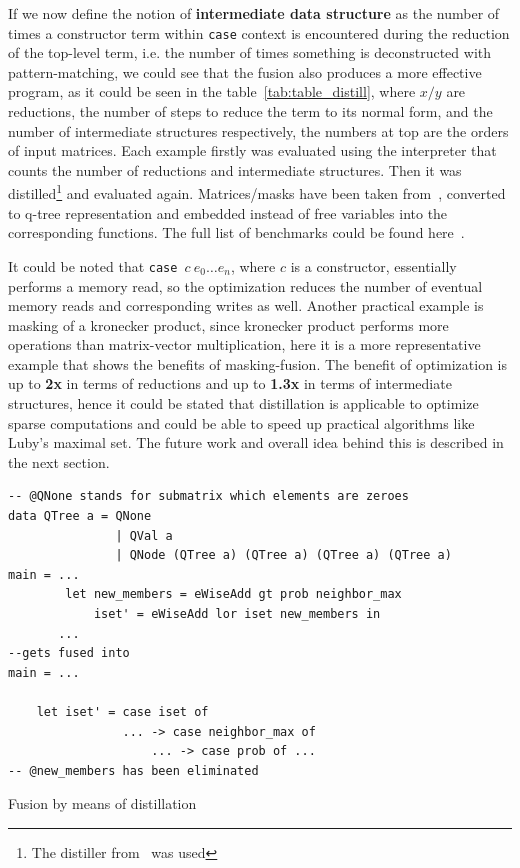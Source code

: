 \documentclass[acmsmall,review,nonacm]{acmart}\settopmatter{printfolios=true,printccs=false,printacmref=false}
\begin{document}
If we now define the notion of \textbf{intermediate data structure} as the number of times a constructor term within \texttt{case} context is encountered during the reduction of the top-level term, i.e. the number of times something is deconstructed with pattern-matching, we could see that the fusion also produces a more effective program, as it could be seen in the table~\ref{tab:table_distill}, where $x / y$ are reductions, the number of steps to reduce the term to its normal form, and the number of intermediate structures respectively, the numbers at top are the orders of input matrices. Each example firstly was evaluated using the interpreter that counts the number of reductions and intermediate structures. Then it was distilled\footnote{The distiller from~\cite{distillation} was used} and evaluated again. Matrices/masks have been taken from~\cite{Florida}, converted to q-tree representation and embedded instead of free variables into the corresponding functions. The full list of benchmarks could be found here~\cite{YaccPOT}.

It could be noted that \texttt{case }$c\: e_0 \ldots e_n$, where $c$ is a constructor, essentially performs a memory read, so the optimization reduces the number of eventual memory reads and corresponding writes as well. Another practical example is masking of a kronecker product, since kronecker product performs more operations than matrix-vector multiplication, here it is a more representative example that shows the benefits of masking-fusion. The benefit of optimization is up to \textbf{2x} in terms of reductions and up to \textbf{1.3x} in terms of intermediate structures, hence it could be stated that distillation is applicable to optimize sparse computations and could be able to speed up practical algorithms like Luby's maximal set. The future work and overall idea behind this is described in the next section. 





\begin{listing}

\begin{verbatim}
-- @QNone stands for submatrix which elements are zeroes
data QTree a = QNone  
               | QVal a 
               | QNode (QTree a) (QTree a) (QTree a) (QTree a) 
main = ...
        let new_members = eWiseAdd gt prob neighbor_max 
            iset' = eWiseAdd lor iset new_members in
       ...
--gets fused into
main = ...

    let iset' = case iset of
                ... -> case neighbor_max of
                    ... -> case prob of ...
-- @new_members has been eliminated
\end{verbatim}
\caption{Fusion by means of distillation}
\label{lst:fusionhosc}

\end{listing}
\end{document}
